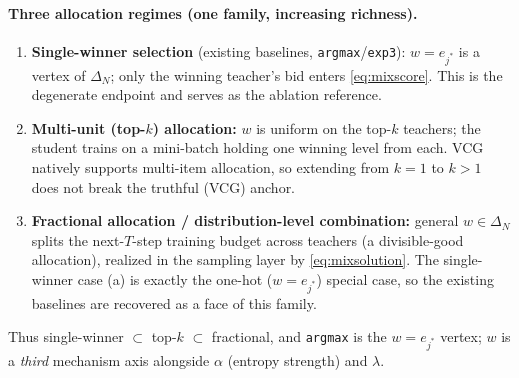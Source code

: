 \documentclass[11pt]{article}
\newcommand{\simplex}{\Delta}
\begin{document}
\paragraph{Three allocation regimes (one family, increasing richness).}
\begin{enumerate}[topsep=2pt,itemsep=2pt,label=\textup{(\alph*)}]
  \item \textbf{Single-winner selection} (existing baselines, \texttt{argmax}/\texttt{exp3}): $w=e_{j^{*}}$ is a vertex of $\simplex_N$; only the winning teacher's bid enters \eqref{eq:mixscore}. This is the degenerate endpoint and serves as the ablation reference.
  \item \textbf{Multi-unit (top-$k$) allocation:} $w$ is uniform on the top-$k$ teachers; the student trains on a mini-batch holding one winning level from each. VCG natively supports multi-item allocation, so extending from $k=1$ to $k>1$ does not break the truthful (VCG) anchor.
  \item \textbf{Fractional allocation / distribution-level combination:} general $w\in\simplex_N$ splits the next-$T$-step training budget across teachers (a divisible-good allocation), realized in the sampling layer by \eqref{eq:mixsolution}. The single-winner case (a) is exactly the one-hot ($w=e_{j^{*}}$) special case, so the existing baselines are recovered as a face of this family.
\end{enumerate}
Thus single-winner $\subset$ top-$k$ $\subset$ fractional, and \texttt{argmax} is the $w=e_{j^{*}}$ vertex; $w$ is a \emph{third} mechanism axis alongside $\alpha$ (entropy strength) and $\lambda$.
\end{document}
